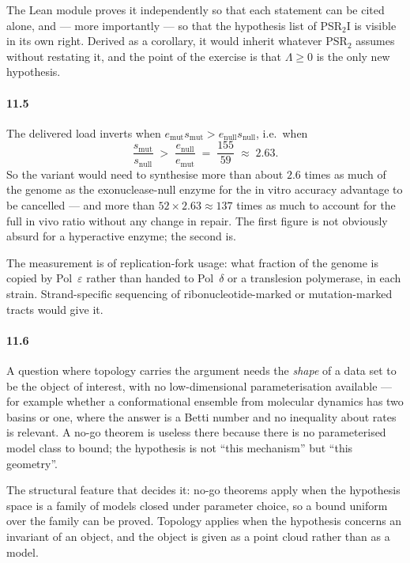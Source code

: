 The Lean module proves it independently so that each statement can be cited
alone, and --- more importantly --- so that the hypothesis list of PSR$_2$I is
visible in its own right. Derived as a corollary, it would inherit whatever
PSR$_2$ assumes without restating it, and the point of the exercise is that
$\Lambda \ge 0$ is the only new hypothesis.

\paragraph{11.5}
The delivered load inverts when
$e_{\mathrm{mut}} s_{\mathrm{mut}} > e_{\mathrm{null}} s_{\mathrm{null}}$, i.e.\
when
\[
  \frac{s_{\mathrm{mut}}}{s_{\mathrm{null}}}
  \;>\; \frac{e_{\mathrm{null}}}{e_{\mathrm{mut}}}
  \;=\; \frac{155}{59} \;\approx\; 2.63 .
\]
So the variant would need to synthesise more than about $2.6$ times as much of
the genome as the exonuclease-null enzyme for the in vitro accuracy advantage to
be cancelled --- and more than $52 \times 2.63 \approx 137$ times as much to
account for the full in vivo ratio without any change in repair. The first
figure is not obviously absurd for a hyperactive enzyme; the second is.

The measurement is of replication-fork usage: what fraction of the genome is
copied by Pol~$\varepsilon$ rather than handed to Pol~$\delta$ or a translesion
polymerase, in each strain. Strand-specific sequencing of ribonucleotide-marked
or mutation-marked tracts would give it.

\paragraph{11.6}
A question where topology carries the argument needs the \emph{shape} of a data
set to be the object of interest, with no low-dimensional parameterisation
available --- for example whether a conformational ensemble from molecular
dynamics has two basins or one, where the answer is a Betti number and no
inequality about rates is relevant. A no-go theorem is useless there because
there is no parameterised model class to bound; the hypothesis is not ``this
mechanism'' but ``this geometry''.

The structural feature that decides it: no-go theorems apply when the hypothesis
space is a family of models closed under parameter choice, so a bound uniform
over the family can be proved. Topology applies when the hypothesis concerns an
invariant of an object, and the object is given as a point cloud rather than as
a model.
